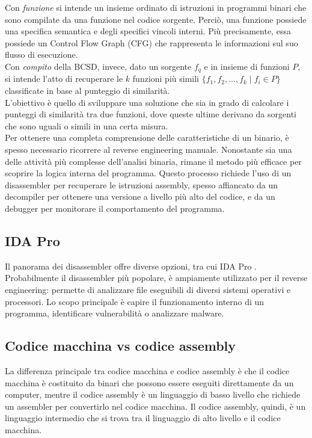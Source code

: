 \documentclass[12pt,a4paper,openright,twoside]{report}
\begin{document}
Con \textit{funzione} si intende un insieme ordinato di istruzioni in programmi binari che sono compilate da una funzione nel codice sorgente. Perciò, una funzione possiede una specifica semantica e degli specifici vincoli interni. Più precisamente, essa possiede un Control Flow Graph (CFG) che rappresenta le informazioni sul suo flusso di esecuzione.\\
Con \textit{compito} della BCSD, invece, dato un sorgente $f_q$ e in insieme di funzioni $P$, si intende l'atto di recuperare le $k$ funzioni più simili $\{ f_1, f_2, \dots, f_k \mid f_i \in P \}$ classificate in base al punteggio di similarità.\\
L'obiettivo è quello di sviluppare una soluzione che sia in grado di calcolare i punteggi di similarità tra due funzioni, dove queste ultime derivano da sorgenti che sono uguali o simili in una certa misura.\\
Per ottenere una completa comprensione delle caratteristiche di un binario, è spesso necessario ricorrere al reverse engineering manuale. Nonostante sia una delle attività più complesse dell'analisi binaria, rimane il metodo più efficace per scoprire la logica interna del programma. Questo processo richiede l'uso di un disassembler per recuperare le istruzioni assembly, spesso affiancato da un decompiler per ottenere una versione a livello più alto del codice, e da un debugger per monitorare il comportamento del programma.

\subsection{IDA Pro}

Il panorama dei disassembler offre diverse opzioni, tra cui IDA Pro \cite{idapro}. Probabilmente il disassembler più popolare, è ampiamente utilizzato per il reverse engineering: permette di analizzare file eseguibili di diversi sistemi operativi e processori. Lo scopo principale è capire il funzionamento interno di un programma, identificare vulnerabilità o analizzare malware.

\subsection{Codice macchina vs codice assembly}

La differenza principale tra codice macchina e codice assembly è che il codice macchina è costituito da binari che possono essere eseguiti direttamente da un computer, mentre il codice assembly è un linguaggio di basso livello che richiede un assembler per convertirlo nel codice macchina. Il codice assembly, quindi, è un linguaggio intermedio che si trova tra il linguaggio di alto livello e il codice macchina.
\end{document}
